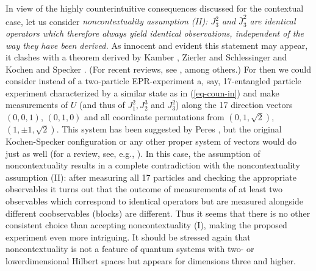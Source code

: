 In view of the highly counterintuitive consequences discussed for the
contextual case, let us consider
{\em noncontextuality assumption (II):
$J_3^2$ and
$\bar J^2_3$ are identical operators which therefore {\em always yield
identical} observations, independent of the way they have been derived.}
As innocent and evident this statement may appear, it clashes with a
theorem derived by
Kamber \cite{kamber65}, Zierler and Schlessinger \cite{ZirlSchl-65} and
Kochen and Specker
\cite{kochen1}. (For recent reviews, see
\cite{redhead,peres,mermin-93,svozil-tkadlec,svozil-ql}, among others.)
For then we could consider instead of a two-particle EPR-experiment
a, say, 17-entangled particle experiment characterized by a similar
state as in
(\ref{eq-coun-in})
and make measurements of $U$ (and thus of  $J_1^2,J_2^3$ and $J_3^2$) along  the 17
direction vectors $(0,0,1)$,  $(0,1,0)$
and all coordinate permutations from $(0,1,\sqrt2)$, $(1,\pm1,\sqrt2)$. This system
has been
suggested by Peres \cite{peres-91,peres}, but the original Kochen-Specker configuration
or any other proper system of vectors would do just as well (for a review, see,
e.g., \cite{mermin-93,svozil-tkadlec,svozil-ql}).
In this case, the assumption of noncontextuality results in a complete
contradiction with the noncontextuality assumption (II):
after measuring all 17 particles and checking the appropriate
observables it turns out that the outcome of measurements of at least
two observables which
correspond to identical operators but are measured alongside different
coobservables (blocks) are different.
 Thus it seems    that
there is no other consistent choice than accepting
noncontextuality (I), making the proposed experiment even more intriguing.
It should be stressed again that noncontextuality is not a feature of quantum systems with two- or
lowerdimensional Hilbert spaces but appears for dimensions three and higher.







%



